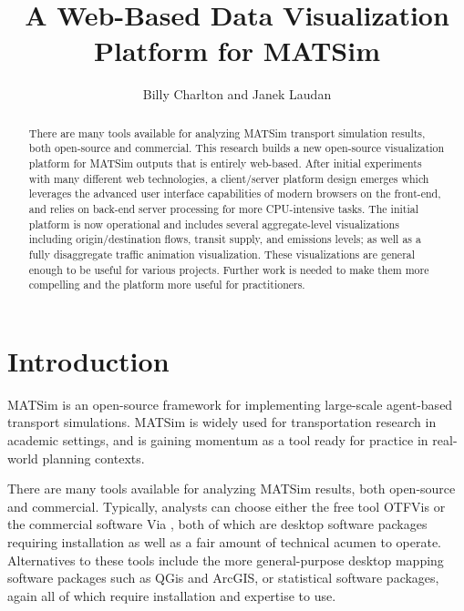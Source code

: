 \documentclass[Afour,sagev,times]{sagej}
\begin{document}

\title{A Web-Based Data Visualization Platform for MATSim}

\author{Billy Charlton and Janek Laudan}




\begin{abstract}
There are many tools available for analyzing MATSim transport
simulation results, both open-source and commercial. This research
builds a new open-source visualization platform for MATSim outputs that
is entirely web-based. After initial experiments with many different web
technologies, a client/server platform design emerges which leverages
the advanced user interface capabilities of modern browsers on the
front-end, and relies on back-end server processing for more CPU-intensive
tasks. The initial platform is now operational and includes several
aggregate-level visualizations including origin/destination flows,
transit supply, and emissions levels; as well as a fully disaggregate
traffic animation visualization. These visualizations are general
enough to be useful for various projects. Further work is needed
to make them more compelling and the platform more useful for practitioners.
\end{abstract}


\maketitle

\section{Introduction}

MATSim\cite{R1} is an open-source framework for implementing large-scale agent-based transport simulations. MATSim is widely used for transportation research in academic settings, and is gaining momentum as a tool ready for practice in real-world planning contexts.

There are many tools available for analyzing MATSim results, both
open-source and commercial. Typically, analysts can choose either
the free tool OTFVis\cite{R2} or the commercial software
Via \cite{R3}, both of which are desktop software packages requiring installation as well as a fair amount of technical acumen to operate. Alternatives to these tools include the more general-purpose desktop mapping software packages such as QGis and ArcGIS, or statistical software packages, again all of which require installation and expertise to use.
\end{document}
